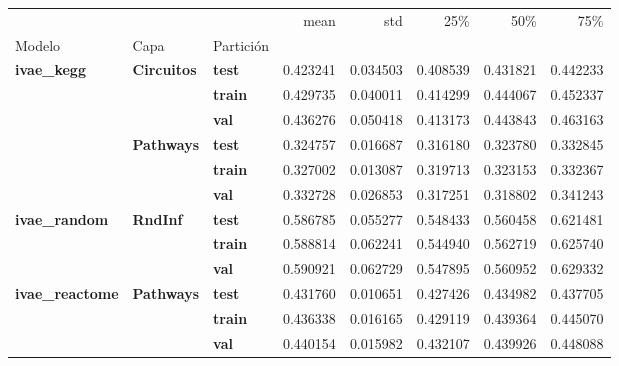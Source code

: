 \begin{tabular}{lllrrrrr}
\toprule
 &  &  & mean & std & 25\% & 50\% & 75\% \\
Modelo & Capa & Partición &  &  &  &  &  \\
\midrule
\multirow[t]{6}{*}{\textbf{ivae\_kegg}} & \multirow[t]{3}{*}{\textbf{Circuitos}} & \textbf{test} & 0.423241 & 0.034503 & 0.408539 & 0.431821 & 0.442233 \\
\textbf{} & \textbf{} & \textbf{train} & 0.429735 & 0.040011 & 0.414299 & 0.444067 & 0.452337 \\
\textbf{} & \textbf{} & \textbf{val} & 0.436276 & 0.050418 & 0.413173 & 0.443843 & 0.463163 \\
\cline{2-8}
\textbf{} & \multirow[t]{3}{*}{\textbf{Pathways}} & \textbf{test} & 0.324757 & 0.016687 & 0.316180 & 0.323780 & 0.332845 \\
\textbf{} & \textbf{} & \textbf{train} & 0.327002 & 0.013087 & 0.319713 & 0.323153 & 0.332367 \\
\textbf{} & \textbf{} & \textbf{val} & 0.332728 & 0.026853 & 0.317251 & 0.318802 & 0.341243 \\
\cline{1-8} \cline{2-8}
\multirow[t]{3}{*}{\textbf{ivae\_random}} & \multirow[t]{3}{*}{\textbf{RndInf}} & \textbf{test} & 0.586785 & 0.055277 & 0.548433 & 0.560458 & 0.621481 \\
\textbf{} & \textbf{} & \textbf{train} & 0.588814 & 0.062241 & 0.544940 & 0.562719 & 0.625740 \\
\textbf{} & \textbf{} & \textbf{val} & 0.590921 & 0.062729 & 0.547895 & 0.560952 & 0.629332 \\
\cline{1-8} \cline{2-8}
\multirow[t]{3}{*}{\textbf{ivae\_reactome}} & \multirow[t]{3}{*}{\textbf{Pathways}} & \textbf{test} & 0.431760 & 0.010651 & 0.427426 & 0.434982 & 0.437705 \\
\textbf{} & \textbf{} & \textbf{train} & 0.436338 & 0.016165 & 0.429119 & 0.439364 & 0.445070 \\
\textbf{} & \textbf{} & \textbf{val} & 0.440154 & 0.015982 & 0.432107 & 0.439926 & 0.448088 \\
\cline{1-8} \cline{2-8}
\bottomrule
\end{tabular}
